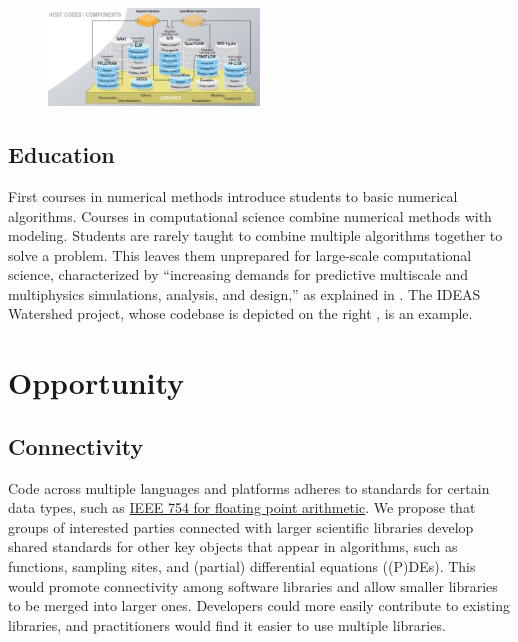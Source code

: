\documentclass{amsart}
\begin{document}
\begin{figure}
    \includegraphics[width = 0.5\textwidth]{cropped-ideas-watersheds-software-ecosystem-road.jpg}
\end{figure}

\subsection{Education} 
First courses in numerical methods \cite{BurFaiBur16a} introduce students to  basic numerical algorithms.  Courses in computational science \cite{HolEic19a,ShifShif14a} combine numerical methods with modeling.  Students are rarely taught to combine multiple algorithms together to solve a problem.  This leaves them unprepared for  large-scale computational science, characterized by  ``increasing demands for predictive multiscale and multiphysics simulations, analysis, and design,'' as explained in \cite{IDEASAbout}.  The IDEAS Watershed project, whose codebase is depicted on the right \cite{IDEASWatershedPict}, is an example.

   







\section{Opportunity} %
\subsection{Connectivity} 
Code across multiple languages and platforms adheres to standards for certain data types, such as \href{https://en.wikipedia.org/wiki/IEEE_754}{IEEE 754 for floating point arithmetic}.  We propose that groups of interested parties connected with larger scientific libraries develop shared standards for other key objects that appear in algorithms, such as functions, sampling sites, and (partial) differential equations ((P)DEs). This would promote connectivity among software libraries and allow smaller libraries to be merged into larger ones.  Developers could more easily contribute to existing libraries, and practitioners would find it easier to use multiple libraries.
\end{document}
